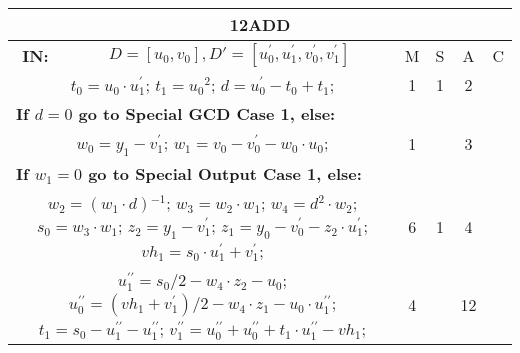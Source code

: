 \begin{tabular}{|c|cr|c|c|c|c|}
\hline
\multicolumn{7}{|c|}{\bf{12ADD}} \TS \\
\hline
\bf{IN:} &\multicolumn{2}{|c|}{$D = [u_0,v_0], D' = [u^{\prime}_0,u^{\prime}_1,v^{\prime}_0,v^{\prime}_1]$}
\TS & M & \hspace{1pt}S\hspace{1pt} & A & \hspace{1pt}C\hspace{1pt} \\
\hline
\multicolumn{3}{|R{340pt}|}{ 
$t_0=u_0 \cdot u^{\prime}_1$;\hspace{4pt}
$t_1=u_0{}^{2}$;\hspace{4pt}
$d=u^{\prime}_0-t_0+t_1$;\hspace{4pt}
} & 1 & 1 & 2 & \\
\multicolumn{3}{|l|}{ 
 \bf{If $d = 0$ go to Special GCD Case 1, else:} } &  &  &  & \\
\multicolumn{3}{|R{340pt}|}{ 
$w_0=y_1-v^{\prime}_1$;\hspace{4pt}
$w_1=v_0-v^{\prime}_0-w_0 \cdot u_0$;\hspace{4pt}
} & 1 &  & 3 & \\
\multicolumn{3}{|l|}{ 
 \bf{If $w_1 = 0$ go to Special Output Case 1, else:} } &  &  &  & \\
\multicolumn{3}{|R{340pt}|}{ 
$w_2=(w_1 \cdot d){}^{-1}$;\hspace{4pt}
$w_3=w_2 \cdot w_1$;\hspace{4pt}
$w_4=d{}^{2} \cdot w_2$;\hspace{4pt}
$s_0=w_3 \cdot w_1$;\hspace{4pt}
$z_2=y_1-v^{\prime}_1$;\hspace{4pt}
$z_1=y_0-v^{\prime}_0-z_2 \cdot u^{\prime}_1$;\hspace{4pt}
$vh_1=s_0 \cdot u^{\prime}_1+v^{\prime}_1$;\hspace{4pt}
} & 6 & 1 & 4 & \\
\multicolumn{3}{|R{340pt}|}{ 
$u^{\prime\prime}_1=s_0/2-w_4 \cdot z_2-u_0$;\hspace{4pt}
$u^{\prime\prime}_0=(vh_1+v^{\prime}_1)/2-w_4 \cdot z_1-u_0 \cdot u^{\prime\prime}_1$;\hspace{4pt}
$t_1=s_0-u^{\prime\prime}_1-u^{\prime\prime}_1$;\hspace{4pt}
$v^{\prime\prime}_1=u^{\prime\prime}_0+u^{\prime\prime}_0+t_1 \cdot u^{\prime\prime}_1-vh_1$;\hspace{4pt}
} & 4 &  & 12 & \\

\end{tabular}
